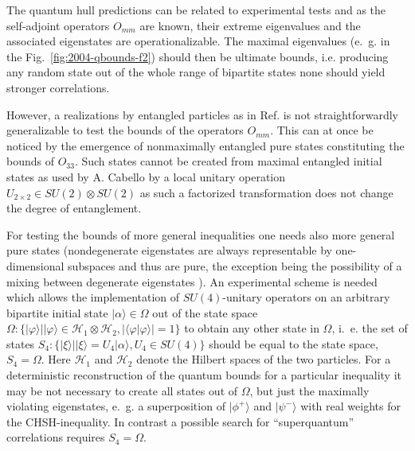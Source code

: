 \documentclass[prl,showpacs,showkeys,amsfonts,amsmath,twocolumn]{revtex4}
\newcommand{\ket}[1]{|#1\rangle}
\begin{document}
The quantum hull
predictions can be
related to experimental tests and as the self-adjoint operators $O_{mm}$ are known,
their extreme eigenvalues and the associated eigenstates are
operationalizable.  The maximal eigenvalues (e.~g. in the Fig.~\ref{fig:2004-qbounds-f2})
should then be ultimate bounds, i.e. producing any random state out of the
whole range of bipartite states none should yield stronger
correlations. 

However, a realizations by entangled particles as in
Ref. \cite{bovino-2003} is not straightforwardly generalizable to test
the bounds of the operators $O_{mm}$. This can at once be noticed by
the emergence of nonmaximally entangled pure states constituting the
bounds of $O_{33}$. Such states cannot be
created from maximal entangled initial states as used by A. Cabello \cite{cabello-2003a} by a local unitary
operation $U_{2\times 2} \in SU(2) \otimes SU(2)$ as such a factorized
transformation does not change the degree of entanglement. 

For testing the bounds of more general inequalities one needs also
more general pure states (nondegenerate eigenstates are always representable by one-dimensional subspaces
and thus are pure, the exception being the possibility of a mixing between
degenerate eigenstates \cite{braunstein92}). An experimental
scheme is needed which allows the implementation of
$SU(4)$-unitary operators on an arbitrary bipartite initial state
$\ket{\alpha}\in \Omega$ out of the state space  $\Omega: \{\ket{\varphi}|
\ket{\varphi} \in \mathcal{H}_1\otimes
\mathcal{H}_2, |\langle{\varphi}|{\varphi}\rangle| = 1\}$ to
obtain any other state in $\Omega$,
i.~e. the set of states $S_4:\{\ket{\xi}| \ket{\xi} = U_4
\ket{\alpha}, U_4 \in SU(4)\}$
should be equal to the state space, $S_4 = \Omega$. Here
$\mathcal{H}_1$ and $\mathcal{H}_2$ denote the Hilbert spaces of the
two particles.
For a deterministic reconstruction of the
quantum bounds for a particular inequality it may be not necessary to
create all states out of $\Omega$, but just the maximally violating
eigenstates, e.~g. a superposition of $\ket{\phi^+}$ and
$\ket{\psi^-}$ with real weights for the CHSH-inequality. In contrast
a possible search for ``superquantum'' correlations requires $S_4 = \Omega$.
\end{document}
